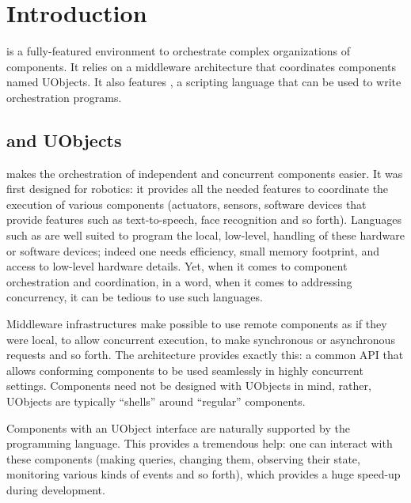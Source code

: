 
\chapter{Introduction}

\usdk is a fully-featured environment to orchestrate complex
organizations of components.  It relies on a middleware architecture
that coordinates components named UObjects.  It also features \us, a
scripting language that can be used to write orchestration programs.

\section{\urbi and UObjects}

\urbi makes the orchestration of independent and concurrent components
easier.  It was first designed for robotics: it provides all the needed
features to coordinate the execution of various components (actuators,
sensors, software devices that provide features such as text-to-speech, face
recognition and so forth).  Languages such as \Cxx are well suited to
program the local, low-level, handling of these hardware or software
devices; indeed one needs efficiency, small memory footprint, and access to
low-level hardware details.  Yet, when it comes to component orchestration
and coordination, in a word, when it comes to addressing concurrency, it can
be tedious to use such languages.

Middleware infrastructures make possible to use remote components as if they
were local, to allow concurrent execution, to make synchronous or
asynchronous requests and so forth.  The  \Cxx architecture
provides exactly this: a common API that allows conforming components to be
used seamlessly in highly concurrent settings.  Components need not be
designed with UObjects in mind, rather, UObjects are typically ``shells''
around ``regular'' components.

Components with an UObject interface are naturally supported by the \us
programming language.  This provides a tremendous help: one can interact
with these components (making queries, changing them, observing their state,
monitoring various kinds of events and so forth), which provides a huge
speed-up during development.


